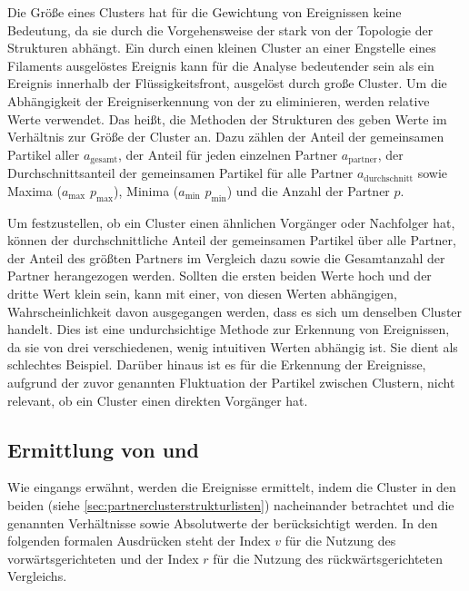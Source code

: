 Die Größe eines Clusters hat für die Gewichtung von Ereignissen keine Bedeutung, da sie durch die Vorgehensweise der \CFD stark von der Topologie der Strukturen abhängt. Ein durch einen kleinen Cluster an einer Engstelle eines Filaments ausgelöstes Ereignis kann für die Analyse bedeutender sein als ein Ereignis innerhalb der Flüssigkeitsfront, ausgelöst durch große Cluster. Um die Abhängigkeit der Ereigniserkennung von der  zu eliminieren, werden relative Werte verwendet. Das heißt, die Methoden der Strukturen des \SECC geben Werte im Verhältnis zur Größe der Cluster an. Dazu zählen der Anteil der gemeinsamen Partikel aller  $a_\text{gesamt}$, der Anteil für jeden einzelnen Partner $a_\text{partner}$, der Durchschnittsanteil der gemeinsamen Partikel für alle Partner $a_\text{durchschnitt}$ sowie Maxima ($a_\text{max}$ $p_\text{max}$), Minima ($a_\text{min}$ $p_\text{min}$) und die Anzahl der Partner $p$.

Um festzustellen, ob ein Cluster einen ähnlichen Vorgänger oder Nachfolger hat, können der durchschnittliche Anteil der gemeinsamen Partikel über alle Partner, der Anteil des größten Partners im Vergleich dazu sowie die Gesamtanzahl der Partner herangezogen werden. Sollten die ersten beiden Werte hoch und der dritte Wert klein sein, kann mit einer, von diesen Werten abhängigen, Wahrscheinlichkeit davon ausgegangen werden, dass es sich um denselben Cluster handelt. Dies ist eine undurchsichtige Methode zur Erkennung von Ereignissen, da sie von drei verschiedenen, wenig intuitiven Werten abhängig ist. Sie dient als schlechtes Beispiel. Darüber hinaus ist es für die Erkennung der Ereignisse, aufgrund der zuvor genannten Fluktuation der Partikel zwischen Clustern, nicht relevant, ob ein Cluster einen direkten Vorgänger hat.

\subsection*{Ermittlung von  und }
Wie eingangs erwähnt, werden die Ereignisse ermittelt, indem die Cluster in den beiden  (siehe \autoref{sec:partnerclusterstrukturlisten}) nacheinander betrachtet und die genannten Verhältnisse sowie Absolutwerte der  berücksichtigt werden. In den folgenden formalen Ausdrücken steht der Index $v$ für die Nutzung des vorwärtsgerichteten und der Index $r$ für die Nutzung des rückwärtsgerichteten Vergleichs.

